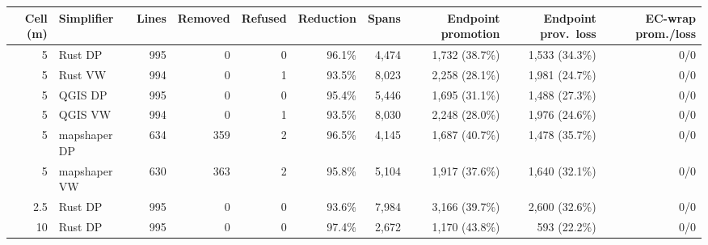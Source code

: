 \documentclass[11pt]{article}
\begin{document}
\begin{center}\scriptsize\setlength{\tabcolsep}{3.5pt}
\begin{tabular}{@{}rlrrrrrrrr@{}}
\toprule
Cell (m) & Simplifier & Lines & Removed & Refused & Reduction & Spans & Endpoint promotion & Endpoint prov.\ loss & EC-wrap prom./loss \\
\midrule
5 & Rust DP & 995 & 0 & 0 & 96.1\% & 4,474 & 1,732 (38.7\%) & 1,533 (34.3\%) & 0/0 \\
5 & Rust VW & 994 & 0 & 1 & 93.5\% & 8,023 & 2,258 (28.1\%) & 1,981 (24.7\%) & 0/0 \\
5 & QGIS DP & 995 & 0 & 0 & 95.4\% & 5,446 & 1,695 (31.1\%) & 1,488 (27.3\%) & 0/0 \\
5 & QGIS VW & 994 & 0 & 1 & 93.5\% & 8,030 & 2,248 (28.0\%) & 1,976 (24.6\%) & 0/0 \\
5 & mapshaper DP & 634 & 359 & 2 & 96.5\% & 4,145 & 1,687 (40.7\%) & 1,478 (35.7\%) & 0/0 \\
5 & mapshaper VW & 630 & 363 & 2 & 95.8\% & 5,104 & 1,917 (37.6\%) & 1,640 (32.1\%) & 0/0 \\
2.5 & Rust DP & 995 & 0 & 0 & 93.6\% & 7,984 & 3,166 (39.7\%) & 2,600 (32.6\%) & 0/0 \\
10 & Rust DP & 995 & 0 & 0 & 97.4\% & 2,672 & 1,170 (43.8\%) & 593 (22.2\%) & 0/0 \\
\bottomrule
\end{tabular}
\end{center}
\end{document}
